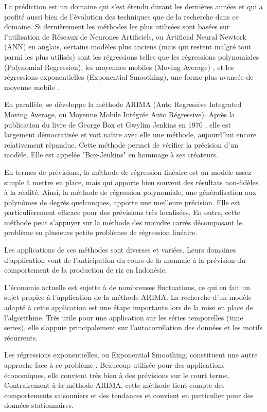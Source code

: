 \documentclass[12pt,a4paper]{article}
\begin{document}
La prédiction est un domaine qui s'est étendu durant les dernières années et qui a profité aussi bien de l'évolution des techniques que de la recherche dans ce domaine. Si dernièrement les méthodes les plus utilisées sont basées sur l'utilisation de Réseaux de Neurones Artificiels, ou Artificial Neural Newtork (ANN) en anglais, certains modèles plus anciens (mais qui restent malgré tout parmi les plus utilisés) sont les régressions telles que les régressions polynomiales \cite{polyregrEva} (Polynomial Regression), les moyennes mobiles (Moving Average) , et les régressions exponentielles (Exponential Smoothing), une forme plus avancée de moyenne mobile \cite{exporeview}.

En parallèle, se développe la méthode ARIMA (Auto Regressive Integrated Moving Average, ou Moyenne Mobile Intégrée Auto Régressive). Après la publication du livre de George Box et Gwylim Jenkins en 1970 \cite{boxjenkins}, elle est largement démocratisée et voit naître avec elle une méthode, aujourd'hui encore relativement répandue. Cette méthode permet de vérifier la précision d'un modèle. Elle est appelée "Box-Jenkins" en hommage à ses créateurs.

En termes de prévisions, la méthode de régression linéaire est un modèle assez simple à mettre en place, mais qui apporte bien souvent des résultats non-fidèles à la réalité. Ainsi, la méthode de régression polynomiale, une généralisation aux polynômes de degrés quelconques, apporte une meilleure précision. Elle est particulièrement efficace pour des prévisions très localisées. En outre, cette méthode peut s'appuyer sur la méthode des moindre carrés \cite{polyregrEva,polyregrElias} décomposant le problème en plusieurs petits problèmes de régression linéaire.

Les applications de ces méthodes sont diverses et variées. Leurs domaines d'application vont de l'anticipation du cours de la monnaie \cite{zambiaES} à la prévision du comportement de la production de riz en Indonésie.

L'économie actuelle est sujette à de nombreuses fluctuations, ce qui en fait un sujet propice à l'application de la méthode ARIMA. La recherche d'un modèle adapté \cite{hughchristensen} à cette application \cite{economyARIMA} est une étape importante lors de la mise en place de l'algorithme. Très utile pour une application sur les séries temporelles (time series), elle s'appuie principalement sur l'autocorrélation des données et les motifs récurrents.

Les régressions exponentielles, ou Exponential Smoothing, constituent une autre approche face à ce problème \cite{exporeview}. Beaucoup utilisée pour des applications économiques, elle convient très bien à des prévisions sur le court terme. Contrairement à la méthode ARIMA, cette méthode tient compte des comportements saisonniers et des tendances et convient en particulier pour des données stationnaires.
\end{document}
